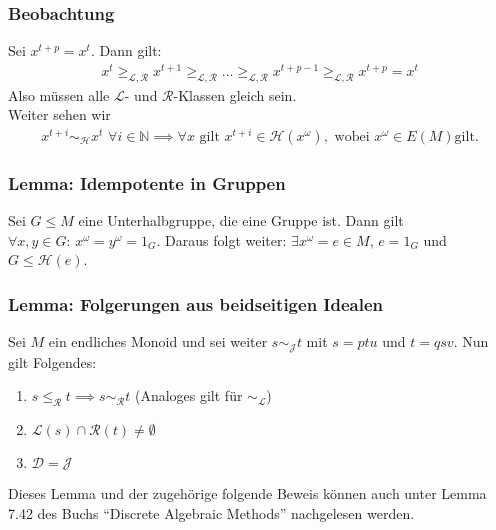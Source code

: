 \documentclass[12pt, german]{article}
\newcommand{\N}{\mathbb{N}}
\newcommand{\pom}{^{\omega}}
\newcommand{\grel}{\sim_{\mathcal{L}}}
\newcommand{\grer}{\sim_{\mathcal{R}}}
\newcommand{\grej}{\sim_{\mathcal{J}}}
\newcommand{\greh}{\sim_{\mathcal{H}}}
\newcommand{\lgrereq}{\leqslant_{\mathcal{R}}}
\begin{document}
	\subsubsection{Beobachtung}
	Sei $x^{t+p} = x^t$. Dann gilt: 
	\begin{align*}
		x^t \geqslant_{\mathcal{L, R}} x^{t+1} \geqslant_{\mathcal{L, R}} \ldots \geqslant_{\mathcal{L, R}} x^{t+p-1} \geqslant_{\mathcal{L, R}} x^{t+p} = x^t
	\end{align*}
	Also müssen alle $\mathcal{L}$- und $\mathcal{R}$-Klassen gleich sein.\\
	Weiter sehen wir
	\begin{align*}
		x^{t+i} \greh x^t \, \, \forall i \in \N 
		\implies \forall x \text{ gilt } x^{t+i} \in \mathcal{H}(x\pom), \text{ wobei } x\pom \in E(M) \text{gilt.}
	\end{align*}
	
	\subsubsection{Lemma: Idempotente in Gruppen}
	Sei $G \leq M$ eine Unterhalbgruppe, die eine Gruppe ist. 
	Dann gilt $\forall x,y \in G:\, x\pom = y\pom = 1_G$.
	Daraus folgt weiter: $\exists x\pom = e \in M, \, e = 1_G$ und $ G \leq \mathcal H(e)$.
	
	
	\subsubsection{Lemma: Folgerungen aus beidseitigen Idealen}
	\label{sec:jklassen}
	Sei $M$ ein endliches Monoid und sei weiter $s \grej t$ mit $s = ptu$ und $t=qsv$. Nun gilt Folgendes: 
	\begin{enumerate}[label = \alph*)]
		\item $s \lgrereq t \implies s \grer t$ (Analoges gilt für $\grel$)
		\item $\mathcal{L}(s) \cap \mathcal{R}(t) \not = \emptyset$
		\item $\mathcal{D} = \mathcal{J}$
	\end{enumerate}
	

	Dieses Lemma und der zugehörige folgende Beweis können auch unter Lemma 7.42 des Buchs ``Discrete Algebraic Methods'' nachgelesen werden.
	
\end{document}
